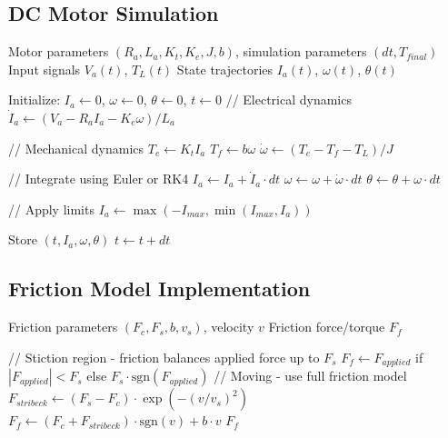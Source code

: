 \subsection{DC Motor Simulation}

\begin{algorithm}
\caption{DC Motor State-Space Simulation}
\begin{algorithmic}[1]
\REQUIRE Motor parameters $(R_a, L_a, K_t, K_e, J, b)$, simulation parameters $(dt, T_{final})$
\REQUIRE Input signals $V_a(t)$, $T_L(t)$
\ENSURE State trajectories $I_a(t)$, $\omega(t)$, $\theta(t)$

\STATE Initialize: $I_a \gets 0$, $\omega \gets 0$, $\theta \gets 0$, $t \gets 0$
    \STATE // Electrical dynamics
    \STATE $\dot{I}_a \gets (V_a - R_a I_a - K_e \omega) / L_a$

    \STATE // Mechanical dynamics
    \STATE $T_e \gets K_t I_a$
    \STATE $T_f \gets b \omega$ 
    \STATE $\dot{\omega} \gets (T_e - T_f - T_L) / J$

    \STATE // Integrate using Euler or RK4
    \STATE $I_a \gets I_a + \dot{I}_a \cdot dt$
    \STATE $\omega \gets \omega + \dot{\omega} \cdot dt$
    \STATE $\theta \gets \theta + \omega \cdot dt$

    \STATE // Apply limits
    \STATE $I_a \gets \max(-I_{max}, \min(I_{max}, I_a))$

    \STATE Store $(t, I_a, \omega, \theta)$
    \STATE $t \gets t + dt$
\ENDWHILE
\end{algorithmic}
\end{algorithm}

\subsection{Friction Model Implementation}

\begin{algorithm}
\caption{Complete Friction Model}
\begin{algorithmic}[1]
\REQUIRE Friction parameters $(F_c, F_s, b, v_s)$, velocity $v$
\ENSURE Friction force/torque $F_f$

    \STATE // Stiction region - friction balances applied force up to $F_s$
    \STATE $F_f \gets F_{applied}$ if $|F_{applied}| < F_s$ else $F_s \cdot \text{sgn}(F_{applied})$
\ELSE
    \STATE // Moving - use full friction model
    \STATE $F_{stribeck} \gets (F_s - F_c) \cdot \exp(-(v/v_s)^2)$
    \STATE $F_f \gets (F_c + F_{stribeck}) \cdot \text{sgn}(v) + b \cdot v$
\ENDIF
\RETURN $F_f$
\end{algorithmic}
\end{algorithm}

